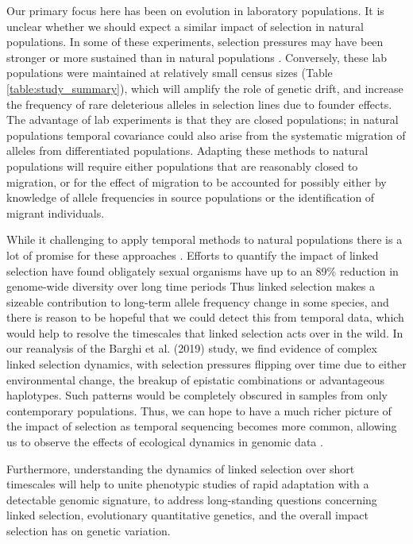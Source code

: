 \documentclass[9pt,twocolumn,twoside]{pnas-new}
\begin{document}
Our primary focus here has been on evolution in laboratory populations. It is
unclear whether we should expect a similar impact of selection in natural
populations. In some of these experiments, selection pressures may have been
stronger or more sustained than in natural populations
\cite{Hendry1999-zu,Hairston2005-ga}. Conversely, these lab populations
were maintained at relatively small census sizes (Table
\ref{table:study_summary}), which will amplify the role of genetic drift,
and increase the frequency of rare deleterious alleles in selection lines
due to founder effects. The advantage of lab experiments is that they are
closed populations; in natural populations temporal covariance could also
arise from the systematic migration of alleles from differentiated populations.
Adapting these methods to natural populations will require either populations
that are reasonably closed to migration, or for the effect of migration to be
accounted for possibly either by knowledge of allele frequencies in source
populations or the identification of migrant individuals. 

While it challenging to apply temporal methods to natural populations there is
a lot of promise for these approaches
\cite{Bergland2014-ij,Machado2018-cs}. Efforts to quantify the impact of
linked selection have found obligately sexual organisms have up to an 89\%
reduction in genome-wide diversity over long time periods
\cite{McVicker2009-ax,Elyashiv2016-vt,Corbett-Detig2015-gt,Coop2016-gx,Comeron2014-nh}
Thus linked selection makes a sizeable contribution to long-term allele
frequency change in some species, and there is reason to be hopeful that we
could detect this from temporal data, which would help to resolve the
timescales that linked selection acts over in the wild. In our
reanalysis of the Barghi et al. (2019) study, we find evidence of complex
linked selection dynamics, with selection pressures flipping over time due to
either environmental change, the breakup of epistatic combinations or
advantageous haplotypes. Such patterns would be completely obscured in samples
from only contemporary populations. Thus, we can hope to have a much
richer picture of the impact of selection as temporal sequencing becomes more
common, allowing us to observe the effects of ecological dynamics in genomic
data \cite{Hairston2005-ga}.

Furthermore, understanding the dynamics of linked selection over short
timescales will help to unite phenotypic studies of rapid adaptation with a
detectable genomic signature, to address long-standing questions concerning
linked selection, evolutionary quantitative genetics, and the overall impact
selection has on genetic variation. 
\end{document}
